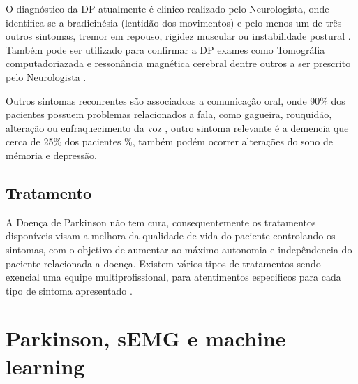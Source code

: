 O diagnóstico da DP atualmente é clinico realizado pelo Neurologista, onde identifica-se a bradicinésia (lentidão dos movimentos) e pelo menos um de três outros sintomas, tremor em repouso, rigidez muscular ou instabilidade postural \cite{gago2014manual}. Também pode ser utilizado para confirmar a DP exames como Tomográfia computadoriazada e ressonância magnética cerebral dentre outros a ser prescrito pelo Neurologista \cite{gago2014manual}.

Outros sintomas reconrentes são associadoas a comunicação oral, onde 90\% dos pacientes possuem problemas relacionados a fala, como gagueira, rouquidão, alteração ou enfraquecimento da voz \cite{zarzur2010laryngeal}, outro sintoma relevante é a demencia que cerca de 25\% dos pacientes \cite{pamplona1996demencia}\%, também podém ocorrer alterações do sono de mémoria e depressão\cite{barbosa2005parkinsons}.

\subsection{Tratamento}
A Doença de Parkinson não tem cura, consequentemente os tratamentos disponíveis visam a melhora da qualidade de vida do paciente controlando os sintomas, com o objetivo de aumentar ao máximo autonomia e indepêndencia do paciente relacionada a doença. Existem vários tipos de tratamentos sendo exencial uma equipe multiprofissional, para atentimentos especificos para cada tipo de sintoma apresentado \cite{saito2011doencca}. 

\section{Parkinson, sEMG e machine learning}